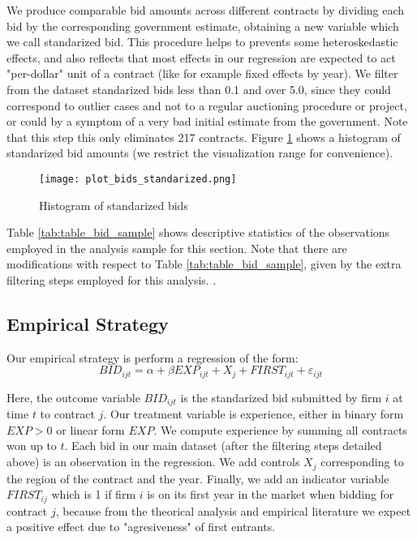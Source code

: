 We produce comparable bid amounts across different contracts by dividing each bid by the corresponding government estimate, obtaining a new variable which we call standarized bid. This procedure helps to prevents some heteroskedastic effects, and also reflects that most effects in our regression are expected to act "per-dollar" unit of a contract (like for example fixed effects by year). We filter from the dataset standarized bids less than 0.1 and over 5.0, since they could correspond to outlier cases and not to a regular auctioning procedure or project, or could by a symptom of a very bad initial estimate from the government. Note that this step this only eliminates 217 contracts. Figure \ref{fig:plot_bids_standarized} shows a histogram of standarized bid amounts (we restrict the visualization range for convenience).

\begin{figure}
  \centering
  \texttt{[image: plot\_bids\_standarized.png]}
  \caption{Histogram of standarized bids}
  \label{fig:plot_bids_standarized}
\end{figure}

Table \ref{tab:table_bid_sample} shows descriptive statistics of the observations employed in the analysis sample for this section. Note that there are modifications with respect to Table \ref{tab:table_bid_sample}, given by the extra filtering steps employed for this analysis. .

\subsection{Empirical Strategy}

Our empirical strategy is perform a regression of the form:
\begin{equation}
\label{eqn:olsbids}
BID_{ijt}=\alpha+ \beta EXP_{ijt}+X_j+FIRST_{ijt}+\varepsilon_{ijt}
\end{equation}

 Here, the outcome variable $BID_{ijt}$ is the standarized bid submitted by firm  $i$ at time $t$  to contract $j$. Our treatment variable is experience, either in binary form $EXP>0$ or linear form $EXP$. We compute experience by summing all contracts won up to $t$. Each bid in our main dataset (after the filtering steps detailed above) is an observation in the regression. We add controls $X_j$ corresponding to the region of the contract and the year. Finally, we add an indicator variable $FIRST_{ij}$ which is 1 if firm $i$ is on its first year in the market when bidding for contract $j$, because from the theorical analysis and empirical literature we expect a positive effect due to "agresiveness" of first entrants.


